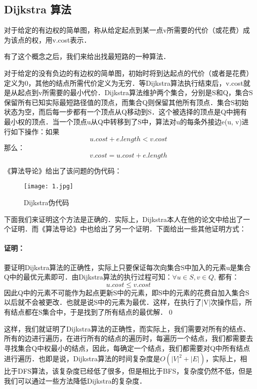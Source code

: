 \documentclass {article}
\begin{document}
\subsection {Dijkstra 算法}
\begin {define} 对于给定的有边权的简单图，称从给定起点到某一点v所需要的代价（或花费）成为该点的权，用v.cost表示．\end {define}
有了这个概念之后，我们来给出找最短路的一种算法．
\begin {theorm} 对于给定的没有负边的有边权的简单图，初始时将到达起点的代价（或者是花费）定义为0，其他的结点所需代价定义为无穷．等Dijkstra算法执行结束后，v.cost就是从起点到v所需要的最小代价．Dijkstra算法维护两个集合，分别是S和Q，集合S保留所有已知实际最短路径值的顶点，而集合Q则保留其他所有顶点．集合S初始状态为空，而后每一步都有一个顶点从Q移动到S．这个被选择的顶点是Q中拥有最小权的顶点．当一个顶点u从Q中转移到了S中，算法对u的每条外接边e(u, v)进行如下操作：如果$$ u.cost+e.length<v.cost $$那么：$$ v.cost=u.cost+e.length $$ \cite {ref2, ref3}\end {theorm}

《算法导论》给出了该问题的伪代码：
\begin {figure} [H]
    \centering
    \texttt{[image: 1.jpg]}
    \caption {Dijkstra伪代码}
\end {figure}

下面我们来证明这个方法是正确的．实际上，Dijkstra本人在他的论文中给出了一个证明．\cite {ref3}而《算法导论》中也给出了另一个证明．\cite {ref2}下面给出一些其他证明方式：
\paragraph {证明：}要证明Dijkstra算法的正确性，实际上只要保证每次向集合S中加入的元素u是集合Q中的最优元素即可．由Dijkstra算法的执行过程可知：$\forall u\in S, v\in Q$, 都有：$$ u.cost\le v.cost $$因此Q中的元素不可能作为起点更新S中的元素，即S中的元素的花费自加入集合S以后就不会被更改．也就是说S中的元素为最优．这样，在执行了|V|次操作后，所有结点都在S集合中，于是找到了所有结点的最优解．\qed

这样，我们就证明了Dijkstra算法的正确性，而实际上，我们需要对所有的结点、所有的边进行遍历，在进行所有的结点的遍历时，每遍历一个结点，我们都需要去寻找集合Q中权最小的结点，因此，每确定一个结点，我们都需要对Q中所有结点进行遍历．也即是说，Dijkstra算法的时间复杂度是$O(|V|^2+|E|)$，实际上，相比于DFS算法，该复杂度已经低了很多，但是相比于BFS，复杂度仍然不低，但是我们可以通过一些方法降低Dijkstra的复杂度．
\end{document}
